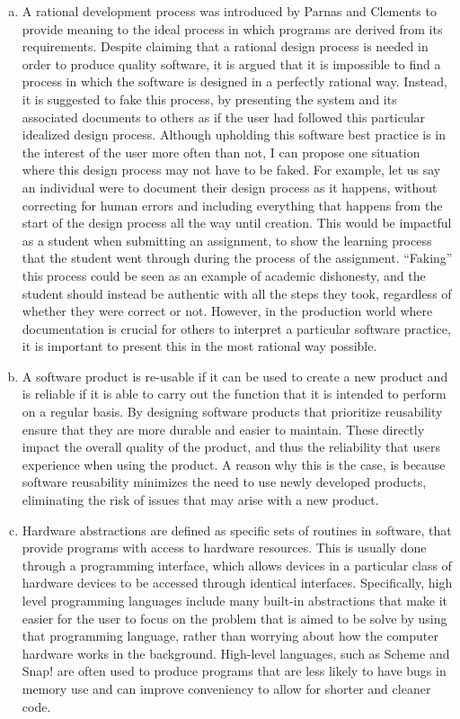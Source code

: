 \documentclass[12pt]{article}
\begin{document}
\begin{enumerate}[(a)]
\item A rational development process was introduced by Parnas and Clements to provide meaning to the ideal process in which programs are derived from its requirements. Despite claiming that a rational design process is needed in order to produce quality software, it is argued that it is impossible to find a process in which the software is designed in a perfectly rational way. Instead, it is suggested to fake this process, by presenting the system and its associated documents to others as if the user had followed this particular idealized design process. Although upholding this software best practice is in the interest of the user more often than not, I can propose one situation where this design process may not have to be faked. For example, let us say an individual were to document their design process as it happens, without correcting for human errors and including everything that happens from the start of the design process all the way until creation. This would be impactful as a student when submitting an assignment, to show the learning process that the student went through during the process of the assignment. “Faking” this process could be seen as an example of academic dishonesty, and the student should instead be authentic with all the steps they took, regardless of whether they were correct or not. However, in the production world where documentation is crucial for others to interpret a particular software practice, it is important to present this in the most rational way possible.

\newpage 

\item A software product is re-usable if it can be used to create a new product and is reliable if it is able to carry out the function that it is intended to perform on a regular basis. By designing software products that prioritize reusability ensure that they are more durable and easier to maintain. These directly impact the overall quality of the product, and thus the reliability that users experience when using the product. A reason why this is the case, is because software reusability minimizes the need to use newly developed products, eliminating the risk of issues that may arise with a new product.

\item Hardware abstractions are defined as specific sets of routines in software, that provide programs with access to hardware resources. This is usually done through a programming interface, which allows devices in a particular class of hardware devices to be accessed through identical interfaces. Specifically, high level programming languages include many built-in abstractions that make it easier for the user to focus on the problem that is aimed to be solve by using that programming language, rather than worrying about how the computer hardware works in the background. High-level languages, such as Scheme and Snap! are often used to produce programs that are less likely to have bugs in memory use and can improve conveniency to allow for shorter and cleaner code. 

\end{enumerate}
\end{document}
